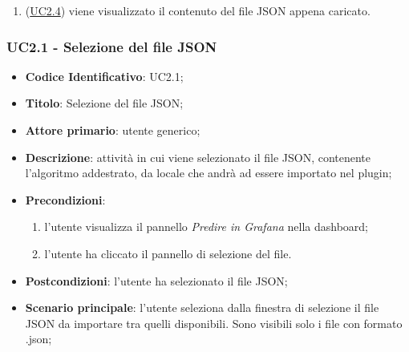 \begin{itemize}
\begin{enumerate}
					\item (\hyperref[par:UC2.4]{UC2.4}) viene visualizzato il contenuto del file JSON appena caricato.
				\end{enumerate}
			
		\end{itemize}
		
		
		\label{par:UC2.1}
		\subsubsection{UC2.1 - Selezione del file JSON}
		\begin{itemize}
			\item\textbf{Codice Identificativo}: UC2.1;
			\item\textbf{Titolo}: Selezione del file JSON;
			\item\textbf{Attore primario}: utente generico;
			\item\textbf{Descrizione}: attività in cui viene selezionato il file JSON, contenente l'algoritmo addestrato, da locale che andrà ad essere importato nel plugin;
			\item\textbf{Precondizioni}:
				\begin{enumerate}
					\item l'utente visualizza il pannello \textit{Predire in Grafana} nella dashboard;
					\item l'utente ha cliccato il pannello di selezione del file.
					\end{enumerate}
			\item\textbf{Postcondizioni}: l'utente ha selezionato il file JSON;
			\item\textbf{Scenario principale}: l'utente seleziona dalla finestra di selezione il file JSON da importare tra quelli disponibili. Sono visibili solo i file con formato .json;
			\end{itemize}
		

